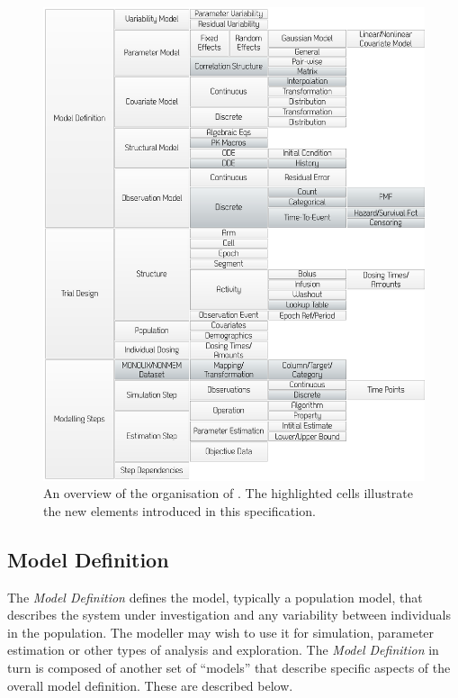 \begin{figure}[htb!]
 \centering
  \includegraphics[height=0.85\textheight]{pics/OverviewOfPharmML}
  \caption{An overview of the organisation of \pharmml. The highlighted cells illustrate the 
  	new elements introduced in this specification.}
  \label{fig:momloverview}
\end{figure}

\subsection{Model Definition}

The \emph{Model Definition} defines the model, typically a population
model, that describes the system under investigation and any variability
between individuals in the population. The modeller may wish to use
it for simulation, parameter estimation or other types of analysis and
exploration. The \emph{Model Definition} in turn is composed of another
set of ``models'' that describe specific aspects of the overall model
definition. These are described below.

